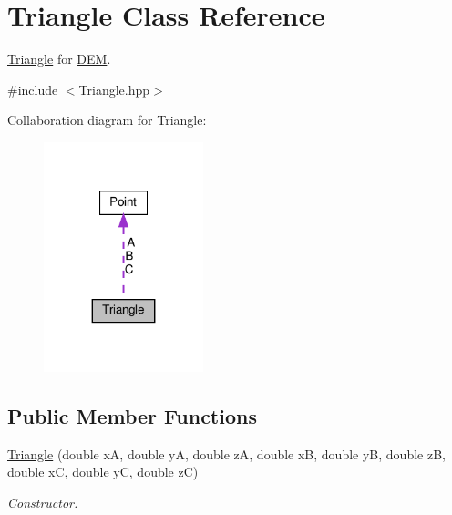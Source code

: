 \hypertarget{classTriangle}{}\section{Triangle Class Reference}
\label{classTriangle}


\hyperlink{classTriangle}{Triangle} for \hyperlink{classDEM}{D\+EM}.  




{\ttfamily \#include $<$Triangle.\+hpp$>$}



Collaboration diagram for Triangle\+:
\nopagebreak
\begin{figure}[H]
\begin{center}
\leavevmode
\includegraphics[width=131pt]{classTriangle__coll__graph}
\end{center}
\end{figure}
\subsection*{Public Member Functions}
\begin{DoxyCompactItemize}
\item 
\hyperlink{classTriangle_a3b15c4bcca06890db57e3a50d55ae7bb}{Triangle} (double xA, double yA, double zA, double xB, double yB, double zB, double xC, double yC, double zC)
\begin{DoxyCompactList}\small\item\em Constructor. \end{DoxyCompactList}\end{DoxyCompactItemize}

